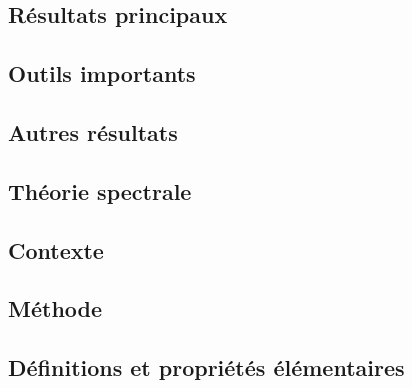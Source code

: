 \documentclass[11pt,a4paper]{article}
\begin{document}
\subsection*{Résultats principaux}

\subsection*{Outils importants}


\subsection*{Autres résultats}


\newpage
\begin{center}  
\section*{Théorie spectrale} 
\end{center}


\subsection*{Contexte}

\subsection*{Méthode}

\subsection*{Définitions et propriétés élémentaires}

\end{document}

